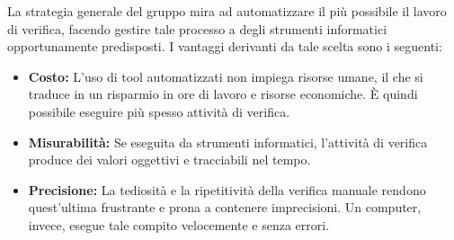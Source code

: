 La strategia generale del gruppo \gruppo \space mira ad automatizzare il più possibile il lavoro di verifica, facendo gestire tale processo a degli strumenti informatici opportunamente predisposti. \newline
I vantaggi derivanti da tale scelta sono i seguenti:
\begin{itemize}
    \item \textbf{Costo:} L'uso di tool automatizzati non impiega risorse umane, il che si traduce in un risparmio in ore di lavoro e risorse economiche. È quindi possibile eseguire più spesso attività di verifica.
    \item \textbf{Misurabilità:} Se eseguita da strumenti informatici, l'attività di verifica produce dei valori oggettivi e tracciabili nel tempo.
    \item \textbf{Precisione:} La tediosità e la ripetitività della verifica manuale rendono quest'ultima frustrante e prona a contenere imprecisioni. Un computer, invece, esegue tale compito velocemente e senza errori.
\end{itemize}